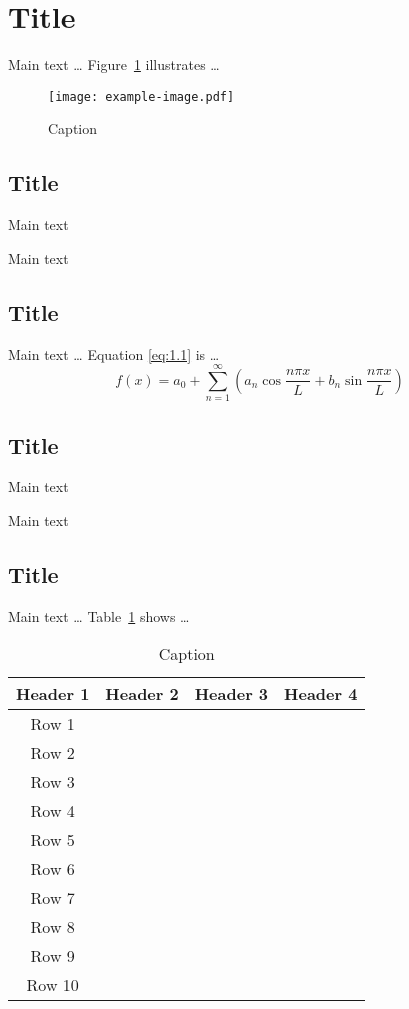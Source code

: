 \documentclass[degree=doctor,language=english]{thuthesis}
\begin{document}
\section{Title}

Main text … Figure~\ref{fig:1.1} illustrates …

\begin{figure}
  \centering
  \texttt{[image: example-image.pdf]}
  \caption{Caption}
  \label{fig:1.1}
\end{figure}

\subsection{Title}

Main text

Main text

\subsection{Title}

Main text … Equation \eqref{eq:1.1} is …
\begin{equation}
  f(x) = a_0 + \sum_{n=1}^\infty \left( a_n \cos⁡ \frac{n \pi x}{L}
    + b_n \sin⁡ \frac{n \pi x}{L} \right)
  \label{eq:1.1}
\end{equation}

\subsection{Title}

Main text

Main text

\subsection{Title}

Main text … Table~\ref{tab:1.1} shows …

\begin{table}
  \centering
  \caption{Caption}
  \label{tab:1.1}
  \begin{tabular}{cccc}
    \toprule
    Header 1 & Header 2 & Header 3 & Header 4 \\
    \midrule
    Row 1 &  &  & \\
    Row 2 &  &  & \\
    Row 3 &  &  & \\
    Row 4 &  &  & \\
    Row 5 &  &  & \\
    Row 6 &  &  & \\
    Row 7 &  &  & \\
    Row 8 &  &  & \\
    Row 9 &  &  & \\
    Row 10 &  &  & \\
    \bottomrule
  \end{tabular}
\end{table}
\end{document}
